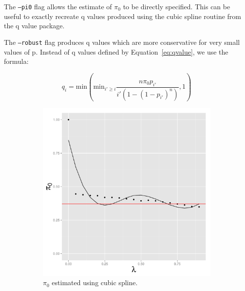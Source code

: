 \documentclass{amsart}
\begin{document}
The \texttt{--pi0} flag allows the estimate of $\pi_0$ to be directly specified. This can be useful to exactly recreate q values produced using the cubic spline routine from the q value package.

The \texttt{--robust} flag produces q values which are more conservative for very small values of p. Instead of q values defined by Equation~\ref{eq:qvalue}, we use the formula:

\begin{equation}
\label{eq:robust}
q_i = \text{min}(\text{min}_{i' \geq i} \frac{n \pi_0p_{i'}} {i'(1 - (1 - p_{i'})^n) }, 1)
\end{equation}

\begin{figure}
  \centering
  \begin{subfigure}[b]{0.5\textwidth}
    \includegraphics[width=\textwidth]{simple_diagnostic}
   \caption{$\pi_0$ estimated using cubic spline.}
   \label{fig:spline_param}
  \end{subfigure}~
  \begin{subfigure}[b]{0.5\textwidth}

\end{subfigure}
\end{figure}
\end{document}
